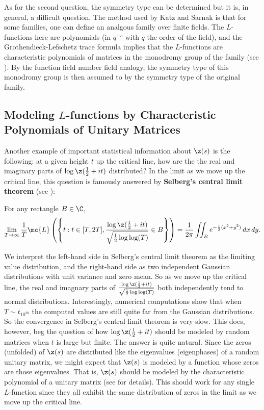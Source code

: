       As for the second question, the symmetry type can be determined but it is, in general, a difficult question. The method used by Katz and Sarnak is that for some families, one can define an analgous family over finite fields. The $L$-functions here are polynomials (in $q^{-s}$ with $q$ the order of the field), and the Grothendieck-Lefschetz trace formula implies that the $L$-functions are characteristic polynomials of matrices in the monodromy group of the family (see ). By the function field number field analogy, the symmetry type of this monodromy group is then assumed to by the symmetry type of the original family.
    \subsection*{Modeling \texorpdfstring{$L$}{L}-functions by Characteristic Polynomials of Unitary Matrices}
      Another example of important statistical information about $\z(s)$ is the following: at a given height $t$ up the critical line, how are the the real and imaginary parts of $\log\z(\frac{1}{2}+it)$ distributed? In the limit as we move up the critical line, this question is famously answered by \textbf{Selberg's central limit theorem} (see ):

      \begin{theorem}
        For any rectangle $B \in \C$,
        \[
          \lim_{T \to \infty}\frac{1}{T}\mc{L}\left(\left\{t:t \in [T,2T],\frac{\log\z(\frac{1}{2}+it)}{\sqrt{\frac{1}{2}\log\log(T)}} \in B\right\}\right) = \frac{1}{2\pi}\iint_{B}e^{-\frac{1}{2}(x^{2}+y^{2})}\,dx\,dy.
        \]
      \end{theorem}

      We interpret the left-hand side in Selberg's central limit theorem as the limiting value distribution, and the right-hand side as two independent Gaussian distributions with unit variance and zero mean. So as we move up the critical line, the real and imagnary parts of $\frac{\log\z(\frac{1}{2}+it)}{\sqrt{\frac{1}{2}\log\log(T)}}$ both independently tend to normal distributions. Interestingly, numerical computations show that when $T \sim t_{10^{20}}$ the computed values are still quite far from the Gaussian distributions. So the convergence in Selberg's central limit theorem is very slow. This does, however, beg the question of how $\log\z(\frac{1}{2}+it)$ should be modeled by random matrices when $t$ is large but finite. The answer is quite natural. Since the zeros (unfolded) of $\z(s)$ are distributed like the eigenvalues (eigenphases) of a random unitary matrix, we might expect that $\z(s)$ is modeled by a function whose zeros are those eigenvalues. That is, $\z(s)$ should be modeled by the characteristic polynomial of a unitary matrix (see  for details). This should work for any single $L$-function since they all exhibit the same distribution of zeros in the limit as we move up the critical line.

